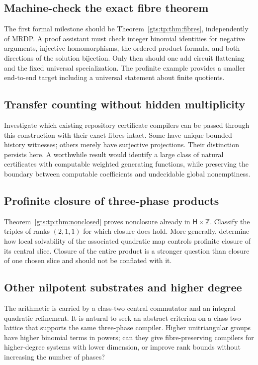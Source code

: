 \documentclass[11pt,letterpaper]{article}
\theoremstyle{definition}
\theoremstyle{remark}
\newcommand{\ZZ}{\mathbb Z}
\newcommand{\HH}{\mathsf H}
\begin{document}
\subsection{Machine-check the exact fibre theorem}\label{gts:tp:q:formal}
The first formal milestone should be Theorem~\ref{gts:tp:thm:fibres}, independently
of MRDP. A proof assistant must check integer binomial identities for
negative arguments, injective homomorphisms, the ordered product formula,
and both directions of the solution bijection. Only then should one add
circuit flattening and the fixed universal specialization. The profinite
example provides a smaller end-to-end target including a universal
statement about finite quotients.

\subsection{Transfer counting without hidden multiplicity}\label{gts:tp:q:counting}
Investigate which existing repository certificate compilers can be passed
through this construction with their exact fibres intact. Some have unique
bounded-history witnesses; others merely have surjective projections.
Their distinction persists here. A worthwhile result would identify a
large class of natural certificates with computable weighted generating
functions, while preserving the boundary between computable coefficients
and undecidable global nonemptiness.

\subsection{Profinite closure of three-phase products}\label{gts:tp:q:profinite}
Theorem~\ref{gts:tp:thm:nonclosed} proves nonclosure already in $\HH\times\ZZ$.
Classify the triples of ranks $(2,1,1)$ for which closure does hold. More
generally, determine how local solvability of the associated quadratic map
controls profinite closure of its central slice. Closure of the entire
product is a stronger question than closure of one chosen slice and should
not be conflated with it.

\subsection{Other nilpotent substrates and higher degree}\label{gts:tp:q:nilpotent}
The arithmetic is carried by a class-two central commutator and an integral
quadratic refinement. It is natural to seek an abstract criterion on a
class-two lattice that supports the same three-phase compiler. Higher
unitriangular groups have higher binomial terms in powers; can they give
fibre-preserving compilers for higher-degree systems with lower dimension,
or improve rank bounds without increasing the number of phases?
\end{document}
